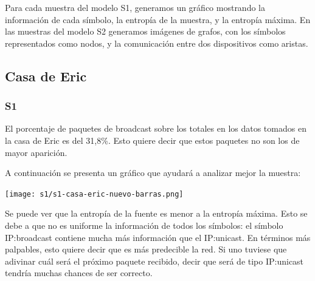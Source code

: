 

Para cada muestra del modelo S1, generamos un gráfico mostrando la información de cada símbolo,
la entropía de la muestra, y la entropía máxima.
En las muestras del modelo S2 generamos imágenes de grafos, con
los símbolos representados como nodos, y la comunicación entre
dos dispositivos como aristas.

\subsection{Casa de Eric}
\subsubsection{S1}
El porcentaje de paquetes de broadcast sobre los totales en los datos tomados en la 
casa de Eric es del 31,8\%. Esto quiere decir que estos paquetes no son los de 
mayor aparición. 

A continuación se presenta un gráfico que ayudará a analizar mejor
la muestra:

\begin{center}
\texttt{[image: s1/s1-casa-eric-nuevo-barras.png]}
\end{center}

Se puede ver que la entropía de la fuente es menor a la entropía máxima. Esto
se debe a que no es uniforme la información de todos los símbolos: el símbolo
IP:broadcast contiene mucha más información que el IP:unicast. En términos más
palpables, esto quiere decir que es más predecible la red. Si uno tuviese que
adivinar cuál será el próximo paquete recibido, decir que será de tipo
IP:unicast tendría muchas chances de ser correcto.

